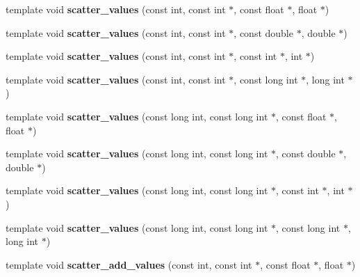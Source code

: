 \begin{DoxyCompactItemize}
\item 
\mbox{\label{namespaceschwz_af2581a54865ba2cf58b58dfd35725798}} 
template void {\bfseries scatter\+\_\+values} (const int, const int $\ast$, const float $\ast$, float $\ast$)
\item 
\mbox{\label{namespaceschwz_a936497bda52c4576c12e53e253cceab2}} 
template void {\bfseries scatter\+\_\+values} (const int, const int $\ast$, const double $\ast$, double $\ast$)
\item 
\mbox{\label{namespaceschwz_a166460cb963d5ee838ced61ad3d382f6}} 
template void {\bfseries scatter\+\_\+values} (const int, const int $\ast$, const int $\ast$, int $\ast$)
\item 
\mbox{\label{namespaceschwz_aa8f9c56f2d0a9aaf5509c3bc86c8155e}} 
template void {\bfseries scatter\+\_\+values} (const int, const int $\ast$, const long int $\ast$, long int $\ast$)
\item 
\mbox{\label{namespaceschwz_a3fec6640931ec9c0e528e90d27d0951d}} 
template void {\bfseries scatter\+\_\+values} (const long int, const long int $\ast$, const float $\ast$, float $\ast$)
\item 
\mbox{\label{namespaceschwz_a30054ec4df2645e3b13bc3df228d1273}} 
template void {\bfseries scatter\+\_\+values} (const long int, const long int $\ast$, const double $\ast$, double $\ast$)
\item 
\mbox{\label{namespaceschwz_a24803b7dd7b84c7c8054e11d6a9194fb}} 
template void {\bfseries scatter\+\_\+values} (const long int, const long int $\ast$, const int $\ast$, int $\ast$)
\item 
\mbox{\label{namespaceschwz_a9136fe3be2935ea9e1baf81e3e190635}} 
template void {\bfseries scatter\+\_\+values} (const long int, const long int $\ast$, const long int $\ast$, long int $\ast$)
\item 
\mbox{\label{namespaceschwz_a5f049658ff61cb915da9215e10b42ecc}} 
template void {\bfseries scatter\+\_\+add\+\_\+values} (const int, const int $\ast$, const float $\ast$, float $\ast$)

\end{DoxyCompactItemize}
